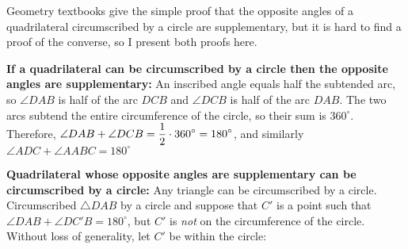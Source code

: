 Geometry textbooks give the simple proof that the opposite angles of a quadrilateral circumscribed by a circle are supplementary, but it is hard to find a proof of the converse, so I present both proofs here.

\textbf{If a quadrilateral can be circumscribed by a circle then the opposite angles are supplementary:} An inscribed angle equals half the subtended arc, so $\angle DAB$ is half of the arc $DCB$ and $\angle DCB$ is half of the arc $DAB$. The two arcs subtend the entire circumference of the circle, so their sum is $360^\circ$. Therefore, $\angle DAB + \angle DCB = \displaystyle\frac{1}{2} \cdot 360^\circ =  180^\circ$, and similarly $\angle ADC + \angle AABC = 180^\circ$

\vspace*{-2ex}

\begin{center}
\end{center}

\vspace*{-2ex}

\textbf{Quadrilateral whose opposite angles are supplementary can be circumscribed by a circle:} Any triangle can be circumscribed by a circle. Circumscribed $\triangle DAB$ by a circle and suppose that $C'$ is a point such that $\angle DAB + \angle DC'B = 180^\circ$, but $C'$ is \emph{not} on the circumference of the circle. Without loss of generality, let $C'$ be within the circle:

\vspace*{-1ex}

